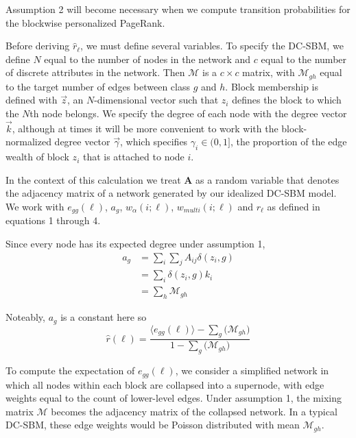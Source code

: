 \documentclass[12pt]{article}
\begin{document}
Assumption 2 will become necessary when we compute transition probabilities for the blockwise personalized PageRank. 

Before deriving $\hat{r}_\ell$, we must define several variables.  To specify the DC-SBM, we define $N$ equal to the number of nodes in the network and $c$ equal to the number of discrete attributes in the network.  Then $\mathcal{M}$ is a $c \times c$ matrix, with $\mathcal{M}_{gh}$ equal to the target number of edges between class $g$ and $h$.  Block membership is defined with $\vec{z}$, an $N$-dimensional vector such that $z_i$ defines the block to which the $N$th node belongs.  We specify the degree of each node with the degree vector $\vec{k}$, although at times it will be more convenient to work with the block-normalized degree vector $\vec{\gamma}$, which specifies $\gamma_i \in (0, 1]$, the proportion of the edge wealth of block $z_i$ that is attached to node $i$.  \cite{clauset:2021}

In the context of this calculation we treat $\mathbf{A}$ as a random variable that denotes the adjacency matrix of a network generated by our idealized DC-SBM model.  We work with $e_{gg}(\ell)$, $a_g$, $w_\alpha(i; \ell)$, $w_{multi}(i; \ell)$ and $r_\ell$ as defined in equations 1 through 4.

Since every node has its expected degree under assumption 1,
\begin{equation}
  \begin{aligned}
    a_g &= \sum_i \sum_j A_{ij} \delta(z_i, g) \\ 
    &= \sum_i \delta(z_i, g) k_i \\
    &= \sum_h \mathcal{M}_{gh}
  \end{aligned}
\end{equation}

Noteably, $a_g$ is a constant here so 
\begin{equation}
  \hat{r}(\ell) = \frac{\langle e_{gg}(\ell) \rangle - \sum_g \big( \mathcal{M}_{gh} \big)}{1 - \sum_g \big( \mathcal{M}_{gh} \big)}
\end{equation}

To compute the expectation of $e_{gg}(\ell)$, we consider a simplified network in which all nodes within each block are collapsed into a supernode, with edge weights equal to the count of lower-level edges.  Under assumption 1, the mixing matrix $\mathcal{M}$ becomes the adjacency matrix of the collapsed network.  In a typical DC-SBM, these edge weights would be Poisson distributed with mean $\mathcal{M}_{gh}$.
\end{document}
